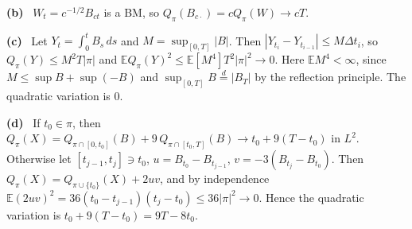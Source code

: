 \documentclass[11pt,a4paper]{article}
\newcommand{\E}{\mathbb{E}}
\newcommand{\1}{\mathbf{1}}
\newcommand{\sub}[1]{\par\smallskip\noindent\textbf{#1}\ }
\begin{document}
\sub{(b)} $W_t=c^{-1/2}B_{ct}$ is a BM, so $Q_\pi(B_{c\cdot})=cQ_\pi(W)\to cT$.

\sub{(c)} Let $Y_t=\int_0^tB_s\,ds$ and $M=\sup_{[0,T]}|B|$. Then $|Y_{t_i}-Y_{t_{i-1}}|\le M\Delta t_i$, so
$Q_\pi(Y)\le M^2T|\pi|$ and $\E Q_\pi(Y)^2\le\E[M^4]T^2|\pi|^2\to0$. Here $\E M^4<\infty$, since
$M\le\sup B+\sup(-B)$ and $\sup_{[0,T]}B\overset d=|B_T|$ by the reflection principle. The quadratic variation is $0$.

\sub{(d)} If $t_0\in\pi$, then $Q_\pi(X)=Q_{\pi\cap[0,t_0]}(B)+9\,Q_{\pi\cap[t_0,T]}(B)\to t_0+9(T-t_0)$ in $L^2$.
Otherwise let $[t_{j-1},t_j]\ni t_0$, $u=B_{t_0}-B_{t_{j-1}}$, $v=-3(B_{t_j}-B_{t_0})$. Then
$Q_\pi(X)=Q_{\pi\cup\{t_0\}}(X)+2uv$, and by independence
$\E(2uv)^2=36(t_0-t_{j-1})(t_j-t_0)\le 36|\pi|^2\to0$. Hence the quadratic variation is $t_0+9(T-t_0)=9T-8t_0$.
\end{document}
